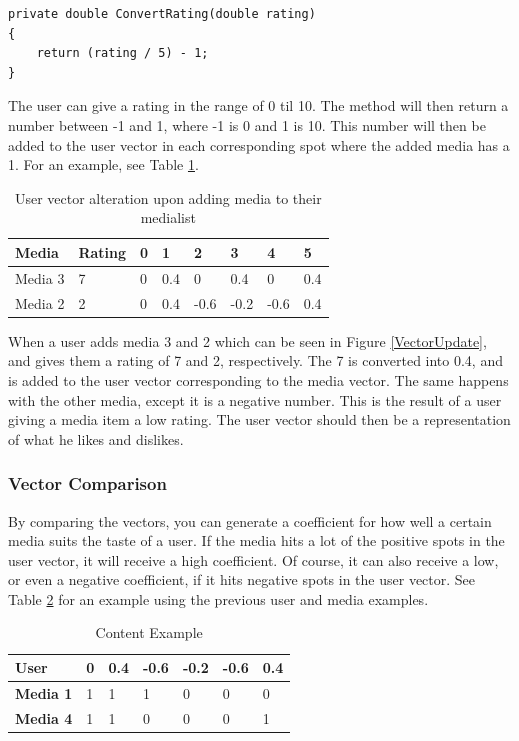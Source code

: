 \begin{lstlisting}[caption={The CompareUserPair method of the recommendation algorithm},label={ConvertRating}]
private double ConvertRating(double rating)
{
	return (rating / 5) - 1;
}
\end{lstlisting}

The user can give a rating in the range of 0 til 10. The method will then return a number between -1 and 1, where -1 is 0 and 1 is 10. This number will then be added to the user vector in each corresponding spot where the added media has a 1. For an example, see Table \ref{AddMediaEx}.

\begin{table}[htb]
\centering
\begin{tabular}{|l|l|l|l|l|l|l|l|} \hline
	\textbf{Media} & \textbf{Rating} & \textbf{0} & \textbf{1} & \textbf{2} & \textbf{3} & \textbf{4} & \textbf{5} \\ \hline
	Media 3 & 7 & 0 & 0.4 & 0 & 0.4 & 0 & 0.4 \\ \hline
	Media 2 & 2 & 0 & 0.4 & -0.6 & -0.2 & -0.6 & 0.4 \\ \hline
\end{tabular}
\caption{User vector alteration upon adding media to their medialist}
\label{AddMediaEx}
\end{table}

When a user adds media 3 and 2 which can be seen in Figure \ref{VectorUpdate}, and gives them a rating of 7 and 2, respectively. The 7 is converted into 0.4, and is added to the user vector corresponding to the media vector. The same happens with the other media, except it is a negative number. This is the result of a user giving a media item a low rating. The user vector should then be a representation of what he likes and dislikes.

\subsubsection{Vector Comparison}

By comparing the vectors, you can generate a coefficient for how well a certain media suits the taste of a user. If the media hits a lot of the positive spots in the user vector, it will receive a high coefficient. Of course, it can also receive a low, or even a negative coefficient, if it hits negative spots in the user vector. See Table \ref{ContentEx} for an example using the previous user and media examples.

\begin{table}[htb]
\centering
\begin{tabular}{|l|l|l|l|l|l|l|} \hline
	\textbf{User} & 0 & 0.4 & -0.6 & -0.2 & -0.6 & 0.4 \\ \hline
	\textbf{Media 1} & 1 & 1 & 1 & 0 & 0 & 0 \\ \hline
	\textbf{Media 4} & 1 & 1 & 0 & 0 & 0 & 1 \\ \hline
\end{tabular}
\caption{Content Example}
\label{ContentEx}
\end{table}

